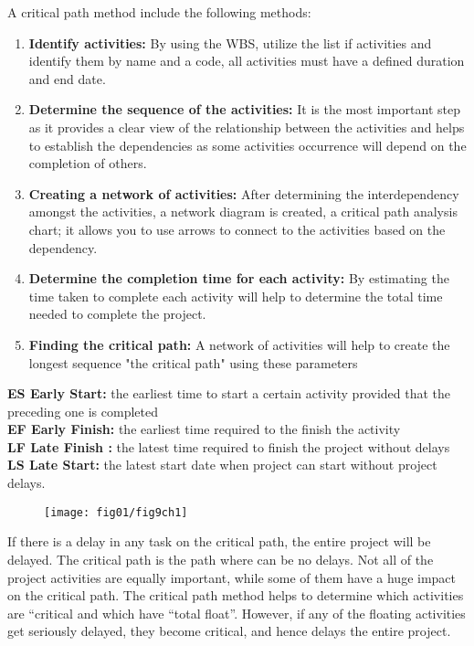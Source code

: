 A critical path method include the following methods:

\begin{enumerate}
	\item \textbf{Identify activities:} By using the WBS, utilize the list if activities and identify them by name and a code, all activities must have a defined duration and end date.
		\item \textbf{Determine the sequence of the activities:} It is the most important step as it provides a clear view of the relationship between the activities and helps to establish the dependencies as some activities occurrence will depend on the completion of others.
			\item \textbf{Creating a network of activities:} After determining the interdependency amongst the activities, a network diagram is created, a critical path analysis chart; it allows you to use arrows to connect to the activities based on the dependency.
			
				\item \textbf{Determine the completion time for each activity:}  By estimating the time taken to complete each activity will help to determine the total time needed to complete the project.
					\item \textbf{Finding the critical path:} A network of activities will help to create the longest sequence "the critical path" using these parameters 
					
\end{enumerate}

\textbf{ES Early Start:} the earliest time to start a certain activity provided that the preceding one is completed \\
\textbf{EF Early Finish:} the earliest time required to the finish the activity  \\
\textbf{LF Late Finish :} the latest time required to finish the project without delays \\
\textbf{LS Late Start:} the latest start date when project can start without project delays. \\


\begin{figure}
	\centering
	\texttt{[image: fig01/fig9ch1]}
\end{figure}


If there is a delay in any task on the critical path, the entire project will be delayed. The critical path is the path where can be no delays. Not all of the project activities are equally important, while some of them have a huge impact on the critical path. The critical path method helps to determine which activities are “critical and which have “total float”. However, if any of the floating activities get seriously delayed, they become critical, and hence delays the entire project.

